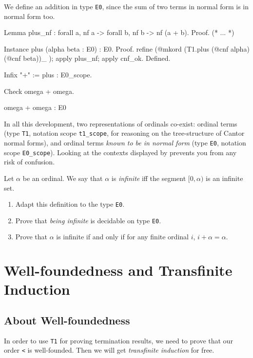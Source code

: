  We define an addition in type \texttt{E0}, since the sum of two terms in normal form is in normal form too.


\begin{Coqsrc}
Lemma plus_nf : forall a,  nf a -> forall b, nf b -> nf (a + b).
Proof.
 (* ... *)

Instance plus (alpha beta : E0) : E0.
Proof.
  refine (@mkord (T1.plus (@cnf alpha) (@cnf beta))_ );
    apply plus_nf; apply cnf_ok.
Defined.

Infix "+" := plus : E0_scope.

Check omega + omega.
\end{Coqsrc}

\begin{Coqanswer}
omega + omega
     : E0
\end{Coqanswer}

\begin{remark}
In all this development, two representations of ordinals co-exist: ordinal terms (type \texttt{T1}, notation scope \texttt{t1\_scope}, for reasoning on the tree-structure of Cantor normal forms), and ordinal terms \emph{known to be in normal form} (type \texttt{E0}, notation scope \texttt{E0\_scope}). Looking at the contexts displayed by \coq{} prevents you from any risk of confusion.
\end{remark}


 \begin{exercise}
Let $\alpha$ be an ordinal. We say that $\alpha$ is \emph{infinite} iff the segment $[0,\alpha)$ is an infinite set. 
\begin{enumerate}
\item Adapt this definition to the type \texttt{E0}.
\item Prove that \emph{being infinite} is decidable on type \texttt{E0}.
\item Prove that $\alpha$ is infinite if and only if for any finite ordinal $i$,
$i+\alpha=\alpha$.
\end{enumerate}
 \end{exercise}

\section{Well-foundedness and Transfinite Induction}


\subsection{About  Well-foundedness}
\label{sec:orgheadline82}
   In order to use \texttt{T1} for proving termination results,
we need to prove that  our order \texttt{<} is well-founded. Then we will get \emph{transfinite induction} for free.


